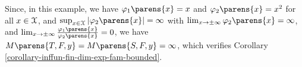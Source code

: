 \begin{example}[name=Normal location-scale model]
	Since, in this example, we have $\varphi_1 \parens{x} = x$ and $\varphi_2 \parens{x} = x^2$ for all $x \in \mathcal{X}$, and $\sup_{x \in \calX} \vert \varphi_2 \parens{x} \vert = \infty$ with $\lim_{x \to \pm \infty} \varphi_2 \parens{x} = \infty$, and $\lim_{x \to \pm \infty} \frac{\varphi_1 \parens{x}}{\varphi_2 \parens{x}} = 0$, we have $M \parens{T, F, y} = M \parens{S, F, y} = \infty$, which verifies Corollary \ref{corollary-inffun-fin-dim-exp-fam-bounded}. 
\end{example}


